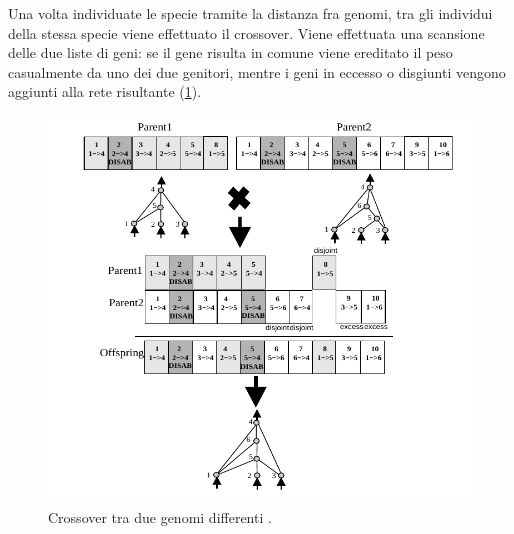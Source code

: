 Una volta individuate le specie tramite la distanza fra genomi, tra gli
individui della stessa specie viene effettuato il crossover. Viene effettuata
una scansione delle due liste di geni: se il gene risulta in comune viene
ereditato il peso casualmente da uno dei due genitori, mentre i geni in eccesso
o disgiunti vengono aggiunti alla rete risultante (\cref{fig:neatcrossover}).

\begin{figure}[H]
	\includegraphics[width=\textwidth]{img/neat-crossover.png}
	\caption{Crossover tra due genomi differenti \cite{stanley2002evolving}.}
	\label{fig:neatcrossover}
\end{figure}
